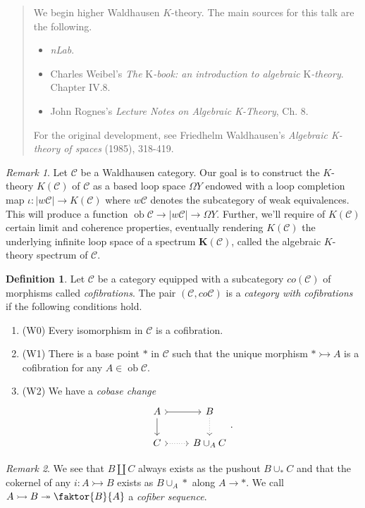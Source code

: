 \documentclass[10pt,letterpaper,cm]{nupset}
\theoremstyle{definition}
\newtheorem{definition}{Definition}
\theoremstyle{theorem}
\theoremstyle{remark}
\newtheorem{remark}{Remark}
\newcommand{\1}{\mathbf{1}}
\renewcommand{\c}{\mathscr{C}}
\newcommand{\0}{\vec 0}
\DeclareMathOperator{\ob}{ob}
\begin{document}
\begin{abstract}
We begin higher Waldhausen $K$-theory. The main sources for this talk are the following.
\begin{itemize}
\item \textit{nLab}.
\item Charles Weibel's \textit{The} K\textit{-book: an introduction to algebraic} K\textit{-theory}.  Chapter IV.8.
\item John Rognes's \textit{Lecture Notes on Algebraic K-Theory}, Ch. 8.
\end{itemize}
For the original development, see Friedhelm Waldhausen's \textit{Algebraic K-theory of spaces} (1985), 318-419. 
\end{abstract}

\begin{remark}
Let $\c$ be a Waldhausen category. Our goal is to construct the $K$-theory $K(\c)$ of $\c$ as a based loop space $\Omega Y$ endowed with a loop completion map $ \iota : |w \c| \to K(\c)$ where $w \c$ denotes the subcategory of weak equivalences. This will produce a function $\ob \c \to |w \c| \to \Omega Y$. Further, we'll require of $K(\c)$ certain limit and coherence properties, eventually rendering $K(\c)$ the underlying infinite loop space of a spectrum $\mathbf{K}(\c)$, called the algebraic $K$-theory spectrum of $\c$.
\end{remark}

\begin{definition}
Let $\c$ be a category equipped with a subcategory $co(\c)$ of morphisms called \textit{cofibrations}. The pair $(\c, co\c)$ is a \textit{category with cofibrations} if the following conditions hold.
\begin{enumerate}
\item (W0) Every isomorphism in $\c$ is a cofibration.
\item (W1) There is a base point $\ast$ in $\c$ such that the unique morphism $\ast \rightarrowtail A$ is a cofibration for any $A \in \ob \c$.
\item (W2) We have a \textit{cobase change}
\[
\begin{tikzcd}
A \arrow[d] \arrow[r, tail] & B \arrow[d, dotted] \\
C \arrow[r, dotted, tail] & B \cup_A C
\end{tikzcd}.
\]
\end{enumerate}
\end{definition}

\begin{remark}
We see that $B \coprod C$ always exists as the pushout $B \cup_{\ast} C$ and that the cokernel of any $i : A \rightarrowtail B$ exists as $B \cup_A \ast$ along $A \to \ast$. We call $A \rightarrowtail  B \twoheadrightarrow \faktor{B}{A}$ a \textit{cofiber sequence}.
\end{remark}
\end{document}
